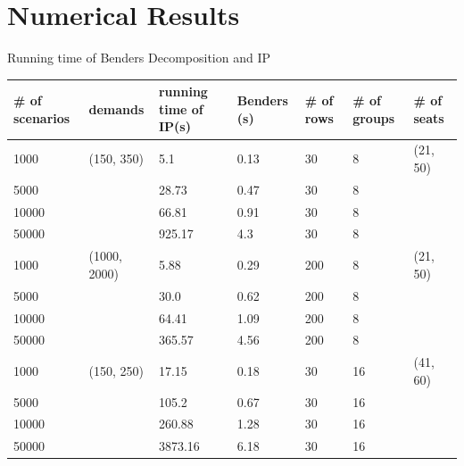 
\section{Numerical Results}
    \frame{\sectionpage}

    \begin{frame}{Running time of Benders Decomposition and IP}
        \tiny
        \begin{table}[ht]
            \centering
            \begin{tabular}{|l|l|l|l|l|l|l|}
            \hline
            \# of scenarios & demands & running time of IP(s) & Benders (s) & \# of rows & \# of groups & \# of seats\\
            \hline
            1000  & (150, 350) & 5.1  & 0.13 & 30 & 8 & (21, 50)\\
            5000  & & 28.73 & 0.47 & 30 & 8 & \\
            10000 & & 66.81  & 0.91 & 30 & 8 & \\
            50000 & & 925.17 & 4.3 & 30 & 8 & \\
            \hline
            1000  & (1000, 2000) & 5.88 & 0.29 & 200 & 8 & (21, 50)\\
            5000  & & 30.0 & 0.62 & 200 & 8 & \\
            10000 & & 64.41 & 1.09 & 200 & 8 & \\
            50000 & & 365.57 & 4.56 & 200 & 8 & \\
            \hline
            1000  & (150, 250) & 17.15  & 0.18 & 30 & 16 & (41, 60) \\
            5000  & & 105.2  & 0.67 & 30 & 16 & \\
            10000 & & 260.88 & 1.28 & 30 & 16 & \\
            50000 & & 3873.16 & 6.18 & 30 & 16 & \\
            \hline
            \end{tabular}
          \end{table}
    \end{frame}
      
